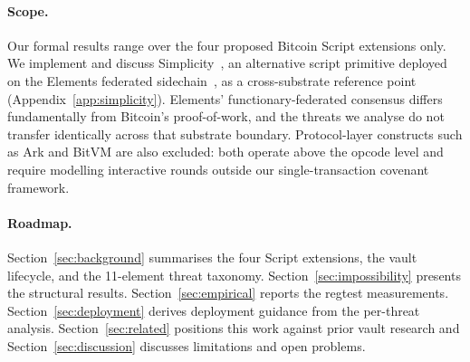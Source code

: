 \paragraph{Scope.} Our formal results range over the four proposed
Bitcoin Script extensions only. We implement and discuss
Simplicity~\cite{OC17}, an alternative script primitive deployed on
the Elements federated sidechain~\cite{DPNS16}, as a cross-substrate
reference point (Appendix~\ref{app:simplicity}). Elements'
functionary-federated consensus differs fundamentally from Bitcoin's
proof-of-work, and the threats we analyse do not transfer identically
across that substrate boundary. Protocol-layer constructs such as Ark
and BitVM are also excluded: both operate above the opcode level and
require modelling interactive rounds outside our single-transaction
covenant framework.

\paragraph{Roadmap.}
Section~\ref{sec:background} summarises the four Script extensions,
the vault lifecycle, and the 11-element threat taxonomy.
Section~\ref{sec:impossibility} presents the structural results.
Section~\ref{sec:empirical} reports the regtest measurements.
Section~\ref{sec:deployment} derives deployment guidance from the
per-threat analysis. Section~\ref{sec:related} positions this work
against prior vault research and Section~\ref{sec:discussion}
discusses limitations and open problems.

\providecommand{\todo}[2][]{\textbf{[TODO: #2]}}
